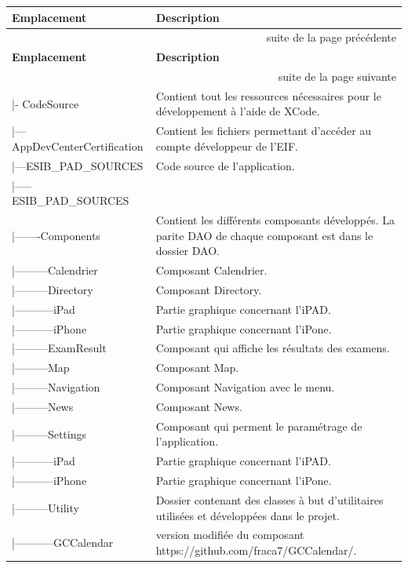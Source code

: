 \documentclass[12pt,a4paper,twoside]{report}
\begin{document}
		 \begin{longtable}{|l|p{8cm}|}

		 \hline  \textbf{Emplacement} & \textbf{Description}   \\ 
		 \endfirsthead
		  \multicolumn{2}{|r|}{{suite de la page précédente}} \\ \hline
		 \hline  \textbf{Emplacement} & \textbf{Description}   \\ 
		 \endhead
		  \multicolumn{2}{|r|}{{suite de la page suivante}} \\ \hline
		 \endfoot
		 \endlastfoot
 \hline |- CodeSource & Contient tout les ressources nécessaires pour le développement à l'aide de XCode.\\
 \hline |---AppDevCenterCertification & Contient les fichiers permettant d'accéder au compte développeur de l'EIF.\\
 \hline |---ESIB\_PAD\_SOURCES & Code source de l'application.\\
 \hline |-----ESIB\_PAD\_SOURCES & \\
 \hline |-------Components & Contient les différents composants développés. La parite DAO de chaque composant est dans le dossier  DAO.\\
 \hline |---------Calendrier & Composant Calendrier.\\
 \hline |---------Directory & Composant Directory.\\
 \hline |-----------iPad & Partie graphique concernant l'iPAD.\\
 \hline |-----------iPhone & Partie graphique concernant l'iPone.\\
 \hline |---------ExamResult & Composant qui affiche les résultats des examens.\\
 \hline |---------Map & Composant Map.\\
 \hline |---------Navigation &  Composant Navigation avec le menu.\\
 \hline |---------News & Composant News.\\
 \hline |---------Settings &  Composant qui perment le paramétrage de l'application.\\
 \hline |-----------iPad & Partie graphique concernant l'iPAD.\\
 \hline |-----------iPhone & Partie graphique concernant l'iPone.\\
 \hline |---------Utility & Dossier contenant des classes à but d'utilitaires utilisées et développées dans le projet.\\
 \hline |-----------GCCalendar & version modifiée du composant https://github.com/fraca7/GCCalendar/.\\

\end{longtable}
\end{document}
